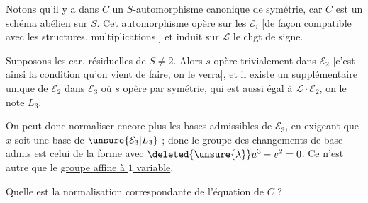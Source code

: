 

Notons qu'il y a dans $C$ un $S$-automorphisme canonique de symétrie, car $C$ est un schéma abélien sur $S$. Cet automorphisme  opère sur les $\mathcal E_i$ [de façon compatible avec les structures, multiplications ] et induit sur $\mathcal L$ le chgt de signe.

Supposons les car. résiduelles de $S\neq2$. Alors
$s$ opère trivialement dans $\mathcal E_2$ [c'est ainsi  la condition qu'on vient de faire, on le verra], et il existe un supplémentaire unique  de $\mathcal E_2$ dans $\mathcal E_3$ où $s$ opère par symétrie,  qui est aussi égal à $\mathcal L\cdot \mathcal E_2$, on le note $L_3$.

On peut donc normaliser encore plus les bases admissibles de $\mathcal E_3$, en exigeant que $x$ soit une base de $\unsure{\mathcal E_3|L_3}$ ; donc le groupe des changements de base admis est celui de la forme
avec $\deleted{\unsure{\lambda}}u^3-v^2=0$.
Ce n'est autre que le \uline{groupe affine à $1$ variable}.

Quelle est la normalisation correspondante de l'équation de $C$ ?
